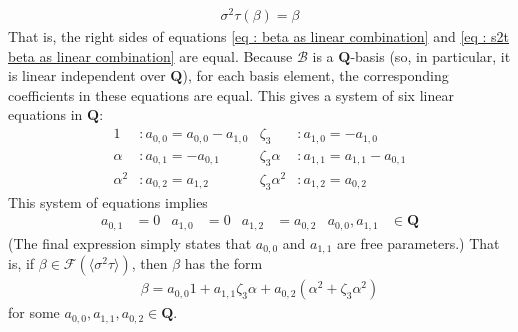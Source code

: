 \documentclass[oneside, english, 11pt]{article}
\newcommand{\fontField}[1]{\mathbf{#1}}
\newcommand{\fixedField}{\mathcal{F}}
\newcommand{\Q}{\rationals}
\newcommand{\rationals}{\fontField{Q}}
\begin{document}
\begin{align*}
\sigma^{2} \tau(\beta)
=
\beta
\end{align*}
That is, the right sides of equations \eqref{eq : beta as linear combination} and \eqref{eq : s2t beta as linear combination} are equal. Because $\mathcal{B}$ is a $\Q$-basis (so, in particular, it is linear independent over $\Q$), for each basis element, the corresponding coefficients in these equations are equal. This gives a system of six linear equations in $\Q$:
\begin{align*}
1
&:
a_{0, 0}
=
a_{0, 0} - a_{1, 0}
&
\zeta_{3}
&:
a_{1, 0}
=
-a_{1, 0}
\\
\alpha
&:
a_{0, 1}
=
-a_{0, 1}
&
\zeta_{3} \alpha
&:
a_{1, 1}
=
a_{1, 1} - a_{0, 1}
\\
\alpha^{2}
&:
a_{0, 2}
=
a_{1, 2}
&
\zeta_{3} \alpha^{2}
&:
a_{1, 2}
=
a_{0, 2}
\end{align*}
This system of equations implies
\begin{align*}
a_{0,1}
&=
0
&
a_{1, 0}
&=
0
&
a_{1, 2}
&=
a_{0, 2}
&
a_{0, 0}, a_{1, 1}
&\in
\Q
\end{align*}
(The final expression simply states that $a_{0, 0}$ and $a_{1, 1}$ are free parameters.) That is, if $\beta \in \fixedField(\langle{}\sigma^{2} \tau\rangle{})$, then $\beta$ has the form
\begin{align*}
\beta
=
a_{0, 0} 1 + a_{1, 1} \zeta_{3} \alpha + a_{0, 2} (\alpha^{2} + \zeta_{3} \alpha^{2})
\end{align*}
for some $a_{0, 0}, a_{1, 1}, a_{0, 2} \in \Q$.%
\end{document}
